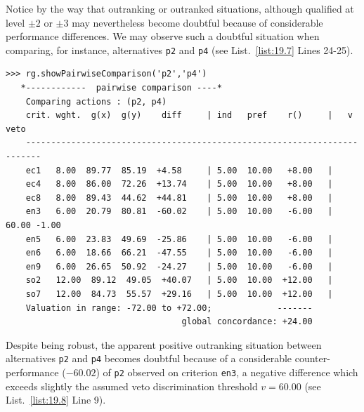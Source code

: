 Notice by the way that outranking or outranked situations, although qualified at level $\pm 2$ or $\pm 3$ may nevertheless become doubtful because of considerable performance differences. We may observe such a doubtful situation when comparing, for instance, alternatives \texttt{p2} and \texttt{p4} (see List.~\vref{list:19.7} Lines 24-25).
\begin{lstlisting}[caption={Comparing alternatives \texttt{p2} and \texttt{p4}},label=list:19.8,basicstyle=\ttfamily\scriptsize]
>>> rg.showPairwiseComparison('p2','p4')
   *------------  pairwise comparison ----*
    Comparing actions : (p2, p4)
    crit. wght.  g(x)  g(y)    diff  	| ind   pref    r() 	|   v    veto
    -------------------------------------------------------------------------
    ec1   8.00  89.77  85.19  +4.58 	| 5.00  10.00   +8.00 	| 
    ec4   8.00  86.00  72.26  +13.74 	| 5.00  10.00   +8.00 	| 
    ec8   8.00  89.43  44.62  +44.81 	| 5.00  10.00   +8.00 	| 
    en3   6.00  20.79  80.81  -60.02 	| 5.00  10.00   -6.00 	| 60.00 -1.00
    en5   6.00  23.83  49.69  -25.86 	| 5.00  10.00   -6.00 	| 
    en6   6.00  18.66  66.21  -47.55 	| 5.00  10.00   -6.00 	| 
    en9   6.00  26.65  50.92  -24.27 	| 5.00  10.00   -6.00 	| 
    so2   12.00  89.12  49.05  +40.07 	| 5.00  10.00  +12.00 	| 
    so7   12.00  84.73  55.57  +29.16 	| 5.00  10.00  +12.00   |
    Valuation in range: -72.00 to +72.00;             -------
                                   global concordance: +24.00      
\end{lstlisting}
Despite being robust, the apparent positive outranking situation between alternatives \texttt{p2} and \texttt{p4} becomes doubtful because of a considerable counter-performance ($-60.02$) of \texttt{p2} observed on criterion \texttt{en3}, a negative difference which exceeds slightly the assumed veto discrimination threshold $v = 60.00$ (see List.~\vref{list:19.8} Line 9).

